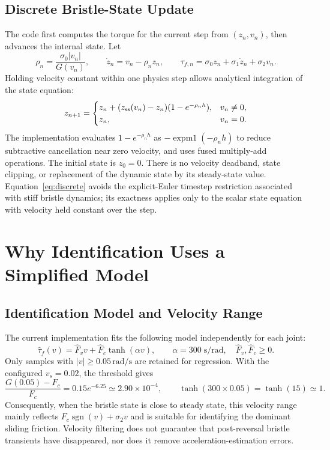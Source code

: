 \documentclass[11pt,a4paper]{report}
\newcommand{\sgn}{\operatorname{sgn}}
\begin{document}
\subsection{Discrete Bristle-State Update}
The code first computes the torque for the current step from $(z_n,v_n)$, then advances the internal state. Let
\begin{equation}
 \rho_n=\frac{\sigma_0|v_n|}{G(v_n)},\qquad
 \dot z_n=v_n-\rho_n z_n,\qquad
 \tau_{f,n}=\sigma_0z_n+\sigma_1\dot z_n+\sigma_2v_n.
\end{equation}
Holding velocity constant within one physics step allows analytical integration of the state equation:
\begin{equation}
 z_{n+1}=\begin{cases}
 z_n+(z_{\rm ss}(v_n)-z_n)(1-e^{-\rho_n h}),&v_n\ne0,\\
 z_n,&v_n=0.
 \end{cases}\label{eq:discrete}
\end{equation}
The implementation evaluates $1-e^{-\rho_n h}$ as $-\operatorname{expm1}(-\rho_n h)$ to reduce subtractive cancellation near zero velocity, and uses fused multiply-add operations. The initial state is $z_0=0$. There is no velocity deadband, state clipping, or replacement of the dynamic state by its steady-state value. Equation~\eqref{eq:discrete} avoids the explicit-Euler timestep restriction associated with stiff bristle dynamics; its exactness applies only to the scalar state equation with velocity held constant over the step.

\section{Why Identification Uses a Simplified Model}
\subsection{Identification Model and Velocity Range}
The current implementation fits the following model independently for each joint:
\begin{equation}
 \widehat\tau_f(v)=\widehat F_v v+
 \widehat F_c\tanh(\alpha v),\qquad
 \alpha=300\;\mathrm{s/rad},\quad \widehat F_v,\widehat F_c\ge0.
 \label{eq:fitmodel}
\end{equation}
Only samples with $|v|\ge0.05\,\mathrm{rad/s}$ are retained for regression. With the configured $v_s=0.02$, the threshold gives
\begin{equation}
 \frac{G(0.05)-F_c}{F_c}=0.15e^{-6.25}
 \simeq2.90\times10^{-4},\qquad
 \tanh(300\times0.05)=\tanh(15)\simeq1.
\end{equation}
Consequently, when the bristle state is close to steady state, this velocity range mainly reflects $F_c\sgn(v)+\sigma_2v$ and is suitable for identifying the dominant sliding friction. Velocity filtering does not guarantee that post-reversal bristle transients have disappeared, nor does it remove acceleration-estimation errors.
\end{document}
